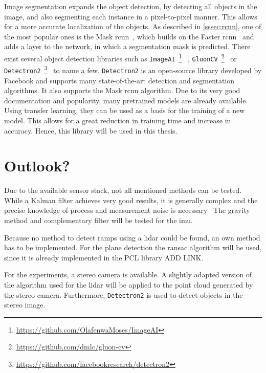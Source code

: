 Image segmentation expands the object detection, by detecting all objects in the image, and also segmenting each instance in a pixel-to-pixel manner.
This allows for a more accurate localization of the objects.
As described in \cref{sssec:rcnn}, one of the most popular ones is the Mask \gls{rcnn}~\cite{He2017}, which builds on the Faster \gls{rcnn}~\cite{Ren2017} and adds a layer to the network, in which a segmentation mask is predicted.
There exist several object detection libraries such as \texttt{ImageAI}~\footnote{\url{https://github.com/OlafenwaMoses/ImageAI}}~\cite{Olafenwa2018} , \texttt{GluonCV}~\footnote{\url{https://github.com/dmlc/gluon-cv}}~\cite{Guo2020} or \texttt{Detectron2}~\footnote{\url{https://github.com/facebookresearch/detectron2}}~\cite{Wu2019} to name a few.
\texttt{Detectron2} is an open-source library developed by Facebook and supports many state-of-the-art detection and segmentation algorithms.
It also supports the Mask \gls{rcnn} algorithm.
Due to its very good documentation and popularity, many pretrained models are already available.
Using transfer learning, they can be used as a basis for the training of a new model.
This allows for a great reduction in training time and increase in accuracy.
Hence, this library will be used in this thesis.



\section{Outlook?}
Due to the available sensor stack, not all mentioned methods can be tested.
While a Kalman filter achieves very good results, it is generally complex and the precise knowledge of process and measurement noise is necessary~\cite{Higgins1975}
The gravity method and complementary filter will be tested for the \gls{imu}.

Because no method to detect ramps using a \gls{lidar} could be found, an own method has to be implemented.
For the plane detection the \gls{ransac} algorithm will be used, since it is already implemented in the PCL library ADD LINK.

For the experiments, a stereo camera is available.
A slightly adapted version of the algorithm used for the \gls{lidar} will be applied to the point cloud generated by the stereo camera.
Furthermore, \texttt{Detectron2} is used to detect objects in the stereo image.

